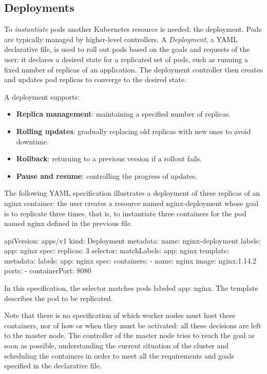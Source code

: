 \subsection{Deployments}

To \emph{instantiate} pods another Kubernetes resource is needed: the deployment. Pods are typically managed by higher-level controllers. A \emph{Deployment}, a YAML declarative file, is used to roll out pods based on the goals and requests of the user: it declares a desired state for a replicated set of pods, such as running a fixed number of replicas of an application. The deployment controller then creates and updates pod replicas to converge to the desired state.

A deployment supports:

\begin{itemize}
\item \textbf{Replica management}: maintaining a specified number of replicas.
\item \textbf{Rolling updates}: gradually replacing old replicas with new ones to avoid downtime.
\item \textbf{Rollback}: returning to a previous version if a rollout fails.
\item \textbf{Pause and resume}: controlling the progress of updates.
\end{itemize}

The following YAML specification illustrates a deployment of three replicas of an nginx container: the user creates a resource named nginx-deployment whose goal is to replicate three times, that is, to instantiate three containers for the pod named nginx defined in the previous file.

\begin{codeblock}
apiVersion: apps/v1
kind: Deployment
metadata:
  name: nginx-deployment
  labels:
    app: nginx
spec:
  replicas: 3
  selector:
    matchLabels:
      app: nginx
  template:
    metadata:
      labels:
        app: nginx
    spec:
      containers:
        - name: nginx
          image: nginx:1.14.2
          ports:
            - containerPort: 8080
\end{codeblock}

In this specification, the selector matches pods labeled app: nginx. The template describes the pod to be replicated.

Note that there is no specification of which worker nodes must host these containers, nor of how or when they must be activated: all these decisions are left to the master node. The controller of the master node tries to reach the goal as soon as possible, understanding the current situation of the cluster and scheduling the containers in order to meet all the requirements and goals specified in the declarative file.

